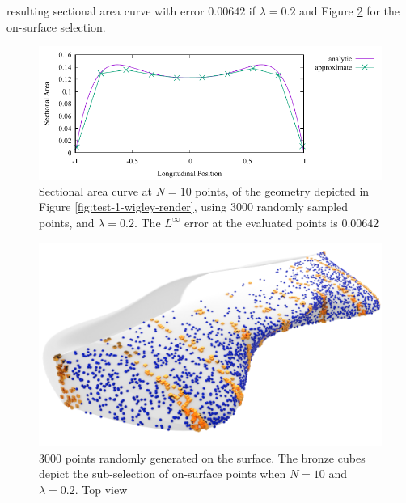 \documentclass{report}
\begin{document}
resulting sectional area curve with error $0.00642$ if $\lambda=0.2$ and Figure \ref{fig:test-1-wigley-render-3K-l-20-N-10-1} for the on-surface selection.
\begin{figure}[H]
    \centering
    \includegraphics[width=0.7\linewidth]{figures/test-1-sac-3K-l-20-N-10.pdf}
    \caption{Sectional area curve at $N=10$ points, of the geometry depicted in Figure \ref{fig:test-1-wigley-render},
    using 3000 randomly sampled points, and $\lambda = 0.2$. The $L^\infty$ error at the evaluated points is $0.00642$}
    \label{fig:test-1-sac-3K-l-20-N-10}
\end{figure}
\begin{figure}[H]
    \centering
    \includegraphics[width=1.0\linewidth]{figures/test-1-wigley-render-3K-l-20-N-10-1.png}
    \caption{3000 points randomly generated on the surface. The bronze cubes depict the sub-selection
    of on-surface points when $N=10$ and $\lambda = 0.2$. Top view}
    \label{fig:test-1-wigley-render-3K-l-20-N-10-1}
\end{figure}
\end{document}
